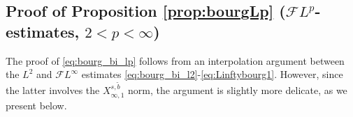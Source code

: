 \documentclass[%
11pt,  reqno]{amsart}
\newcommand{\jap}[1]{\langle #1 \rangle}
\newcommand{\5}{\textup{V}}
\newcommand{\noi}{\noindent}
\newcommand{\FL}{\mathcal{F} L}
\theoremstyle{remark}
\newtheorem{remark}[theorem]{Remark}
\newcommand{\bul}{\bullet}
\newcommand{\TT}{\mathcal{T}}
\newcommand{\al}{\alpha}
\newcommand{\G}{\Gamma}
\newcommand{\jb}[1]
{\langle #1 \rangle}
\numberwithin{equation}{section}
\numberwithin{theorem}{section}
\newcommand{\andreia}[1]{\marginpar{\color{purple} $\Leftarrow\Leftarrow\Leftarrow$}{\smallskip \noi\color{purple}ANDREIA: #1}\smallskip}
\begin{document}





 


\subsection{Proof of Proposition \ref{prop:bourgLp} ($\FL^p$-estimates, $2<p<\infty$)} The proof of \eqref{eq:bourg_bi_lp} follows from an interpolation argument between the $L^2$ and $\FL^\infty$ estimates \eqref{eq:bourg_bi_l2}-\eqref{eq:Linftybourg1}. However, since the latter involves the $X_{\infty,1}^{s,\tilde{b}}$ norm, the argument is slightly more delicate, as we present below.
\end{document}

